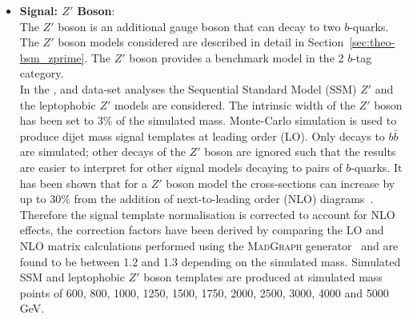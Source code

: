 \begin{itemize}[leftmargin=*]
\item\textbf{Signal: $Z'$ Boson}:  \vspace{1em} \\
  The $Z'$ boson is an additional gauge boson that can decay to two $b$-quarks.
  The $Z'$ boson models considered are
  described in detail in Section~\ref{sec:theo-bsm_zprime}.
  The $Z'$ boson provides a benchmark model in the 2 $b$-tag category.\\

  In the \summer{}, \hm{} and \lm{} data-set analyses
  the Sequential Standard Model (SSM) $Z'$ and the leptophobic $Z'$ models are considered.
  The intrinsic width of the $Z'$ boson has been set to 3\% of the simulated mass.
  Monte-Carlo simulation is used to produce dijet mass signal templates at leading order (LO).
  Only decays to $b\bar{b}$ are simulated;
  other decays of the  $Z'$ boson are ignored such that the
  results are easier to interpret for other signal models decaying to pairs of $b$-quarks.
  It has been shown that for a $Z'$ boson model the cross-sections can increase by up to 30\%
  from the addition of next-to-leading order (NLO) diagrams~\cite{evt-NLO_zprime}.
  Therefore the signal template normalisation is corrected to account for NLO effects,
  the correction factors have been derived by comparing
  the LO and NLO matrix calculations performed using the \textsc{MadGraph} generator~\cite{dibjet-madGraph}
  and are found to be between 1.2 and 1.3 depending on the simulated mass.
  Simulated SSM and leptophobic $Z'$ boson templates are produced at simulated mass points of
  600, 800, 1000, 1250, 1500, 1750, 2000, 2500, 3000, 4000 and 5000 GeV.\\
  

\end{itemize}
